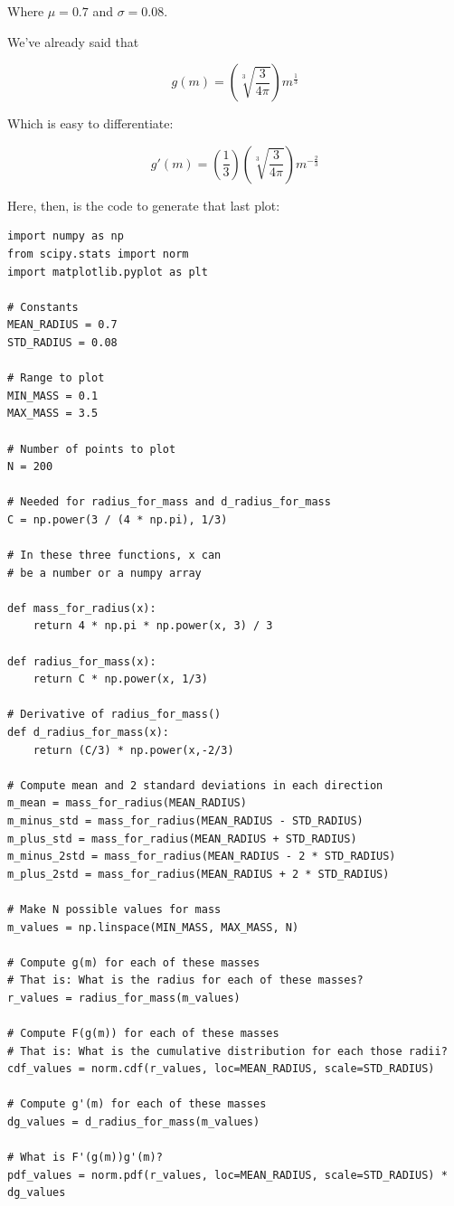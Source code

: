 Where  $\mu = 0.7$ and $\sigma = 0.08$.

We've already said that 

$$g(m) = \left(\sqrt[3]{\frac{3}{4 \pi}}\right) m^{\frac{1}{3}}$$

Which is easy to differentiate:

$$g'(m) = \left(\frac{1}{3} \right) \left(\sqrt[3]{\frac{3}{4 \pi}}\right) m^{-\frac{2}{3}}$$

Here, then, is the code to generate that last plot:

\begin{verbatim}
import numpy as np
from scipy.stats import norm
import matplotlib.pyplot as plt

# Constants
MEAN_RADIUS = 0.7
STD_RADIUS = 0.08

# Range to plot
MIN_MASS = 0.1
MAX_MASS = 3.5

# Number of points to plot
N = 200

# Needed for radius_for_mass and d_radius_for_mass
C = np.power(3 / (4 * np.pi), 1/3)

# In these three functions, x can
# be a number or a numpy array

def mass_for_radius(x):
    return 4 * np.pi * np.power(x, 3) / 3

def radius_for_mass(x):
    return C * np.power(x, 1/3)

# Derivative of radius_for_mass()
def d_radius_for_mass(x):
    return (C/3) * np.power(x,-2/3)

# Compute mean and 2 standard deviations in each direction
m_mean = mass_for_radius(MEAN_RADIUS)
m_minus_std = mass_for_radius(MEAN_RADIUS - STD_RADIUS)
m_plus_std = mass_for_radius(MEAN_RADIUS + STD_RADIUS)
m_minus_2std = mass_for_radius(MEAN_RADIUS - 2 * STD_RADIUS)
m_plus_2std = mass_for_radius(MEAN_RADIUS + 2 * STD_RADIUS)

# Make N possible values for mass
m_values = np.linspace(MIN_MASS, MAX_MASS, N)

# Compute g(m) for each of these masses
# That is: What is the radius for each of these masses?
r_values = radius_for_mass(m_values)

# Compute F(g(m)) for each of these masses
# That is: What is the cumulative distribution for each those radii?
cdf_values = norm.cdf(r_values, loc=MEAN_RADIUS, scale=STD_RADIUS)

# Compute g'(m) for each of these masses
dg_values = d_radius_for_mass(m_values)

# What is F'(g(m))g'(m)?
pdf_values = norm.pdf(r_values, loc=MEAN_RADIUS, scale=STD_RADIUS) * dg_values


\end{verbatim}
